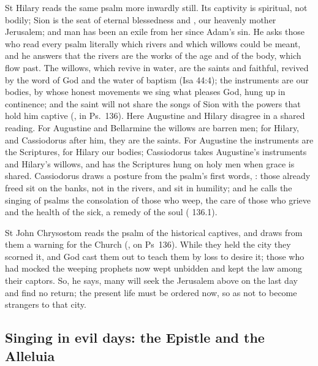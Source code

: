 St Hilary reads the same psalm more inwardly still. Its captivity is spiritual,
not bodily; Sion is the seat of eternal blessedness and , our heavenly mother Jerusalem; and man has been an exile from
her since Adam's sin. He asks those who read every psalm literally which rivers
and which willows could be meant, and he answers that the rivers are the works
of the age and of the body, which flow past. The willows, which revive in water,
are the saints and faithful, revived by the word of God and the water of baptism
(Isa 44:4); the instruments are our bodies, by whose honest movements we sing
what pleases God, hung up in continence; and the saint will not share the songs
of Sion with the powers that hold him captive (,
in Ps.~136). Here Augustine and Hilary disagree in a shared reading. For
Augustine and Bellarmine the willows are barren men; for Hilary, and Cassiodorus
after him, they are the saints. For Augustine the instruments are the
Scriptures, for Hilary our bodies; Cassiodorus takes Augustine's instruments and
Hilary's willows, and has the Scriptures hung on holy men when grace is shared.
Cassiodorus draws a posture from the psalm's first words, : those already freed sit on the banks, not in the rivers, and sit in
humility; and he calls the singing of psalms the consolation of those who weep,
the care of those who grieve and the health of the sick, a remedy of the soul ( 136.1).

St John Chrysostom reads the psalm of the historical captives, and draws from
them a warning for the Church (, on Ps~136). While
they held the city they scorned it, and God cast them out to teach them by loss
to desire it; those who had mocked the weeping prophets now wept unbidden and
kept the law among their captors. So, he says, many will seek the Jerusalem
above on the last day and find no return; the present life must be ordered now,
so as not to become strangers to that city.

\subsection{Singing in evil days: the Epistle and the Alleluia}

